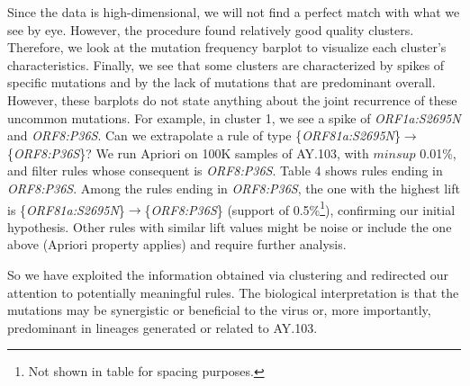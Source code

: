\documentclass[twoside,twocolumn]{article}
\begin{document}
Since the data is high-dimensional, we will not find a perfect match with what we see by eye. However, the procedure found relatively good quality clusters. Therefore, we look at the mutation frequency barplot to visualize each cluster's characteristics. Finally, we see that some clusters are characterized by spikes of specific mutations and by the lack of mutations that are predominant overall. However, these barplots do not state anything about the joint recurrence of these uncommon mutations. For example, in cluster 1, we see a spike of \textit{ORF1a:S2695N} and \textit{ORF8:P36S}. Can we extrapolate a rule of type \{\textit{ORF81a:S2695N}\}$\rightarrow$\{\textit{ORF8:P36S}\}? We run Apriori on 100K samples of AY.103, with $minsup$ 0.01\%, and filter rules whose consequent is \textit{ORF8:P36S}. Table 4 shows rules ending in \textit{ORF8:P36S}. Among the rules ending in \textit{ORF8:P36S}, the one with the highest lift is \{\textit{ORF81a:S2695N}\}$\rightarrow$\{\textit{ORF8:P36S}\} (support of 0.5\%\footnote{Not shown in table for spacing purposes.}), confirming our initial hypothesis. Other rules with similar lift values might be noise or include the one above (Apriori property applies) and require further analysis. 

So we have exploited the information obtained via clustering and redirected our attention to potentially meaningful rules. The biological interpretation is that the mutations may be synergistic or beneficial to the virus or, more importantly, predominant in lineages generated or related to AY.103.
\end{document}
